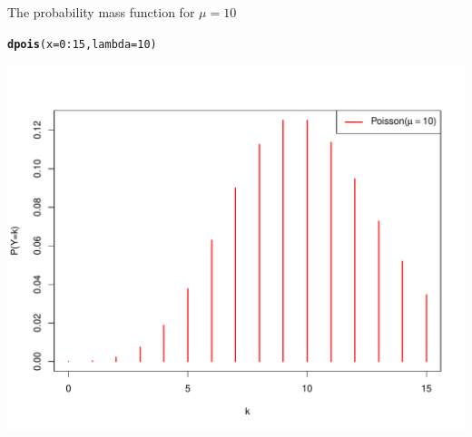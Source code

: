 \documentclass[handout]{beamer}\usepackage[]{graphicx}\usepackage[]{color}
\newcommand{\hlnum}[1]{\textcolor[rgb]{0.686,0.059,0.569}{#1}}%
\newcommand{\hlopt}[1]{\textcolor[rgb]{0,0,0}{#1}}%
\newcommand{\hlstd}[1]{\textcolor[rgb]{0.345,0.345,0.345}{#1}}%
\newcommand{\hlkwc}[1]{\textcolor[rgb]{0.333,0.667,0.333}{#1}}%
\newcommand{\hlkwd}[1]{\textcolor[rgb]{0.737,0.353,0.396}{\textbf{#1}}}%
\newenvironment{knitrout}{}{} %
\begin{document}
\begin{frame}[fragile]{The probability mass function for $\mu=10$}

\begin{knitrout}\scriptsize
{}\color{fgcolor}
\begin{alltt}
\hlkwd{dpois}\hlstd{(}\hlkwc{x} \hlstd{=} \hlnum{0}\hlopt{:}\hlnum{15}\hlstd{,} \hlkwc{lambda} \hlstd{=} \hlnum{10}\hlstd{)}
\end{alltt}

\end{knitrout}

\vspace*{-0.5in}

\begin{knitrout}\scriptsize
{}\color{fgcolor}

{\centering \includegraphics[width=1\linewidth]{figure/unnamed-chunk-5-1} 

}



\end{knitrout}

\end{frame}
\end{document}

